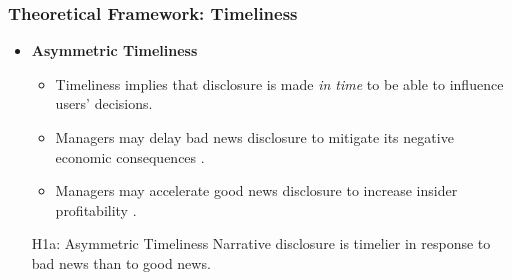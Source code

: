 \documentclass{beamer}
\begin{document}
\begin{frame}
\frametitle{Theoretical Framework: Timeliness}
\begin{itemize}
	\item \textbf{Asymmetric Timeliness}
	
	\begin{itemize}
		\item Timeliness implies that disclosure is made \textit{in time} to be able to influence users' decisions. 
		\item Managers may delay bad news disclosure to mitigate its negative economic consequences \citep{chambersTimelinessReportingStock1984, niessnerStrategicDisclosureTiming2015, segalAreManagersStrategic2016, brockbankStrategicTiming8K2018}.
		\item Managers may accelerate good news disclosure to increase insider profitability  \citep{khalilovAccountingConservatismProfitability2020}.
	\end{itemize}
	
	
	\medskip
	\pause
	\begin{block}{H1a: Asymmetric Timeliness}
		Narrative disclosure is timelier in response to bad news than to good news.
	\end{block}
	
	
\end{itemize}
\end{frame}
\end{document}
